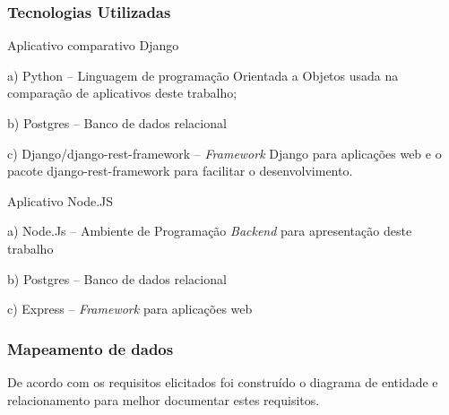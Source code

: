 \subsubsection{Tecnologias Utilizadas}


  Aplicativo comparativo Django
    
    \begin{compactitem}
      \item[a)] Python – Linguagem de programação Orientada a Objetos usada na comparação de aplicativos deste trabalho;
      \item[b)] Postgres – Banco de dados relacional
      \item[c)] Django/django-rest-framework – \textit{Framework} Django para aplicações web e o pacote django-rest-framework
      para facilitar o desenvolvimento.
    \end{compactitem}
    
  Aplicativo Node.JS
  
    \begin{compactitem}
      \item[a)] Node.Js – Ambiente de Programação \textit{Backend} para apresentação deste trabalho
      \item[b)] Postgres – Banco de dados relacional
      \item[c)] Express – \textit{Framework} para aplicações web
    \end{compactitem}
 
\subsubsection{Mapeamento de dados}

  De acordo com os requisitos elicitados foi construído o diagrama de entidade e relacionamento para melhor
  documentar estes requisitos.
  
